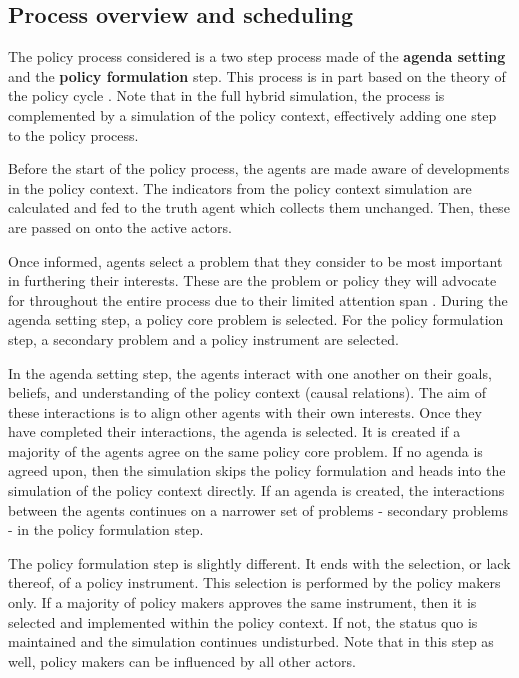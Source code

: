 
\subsection{Process overview and scheduling}
\label{ssec:process}

The policy process considered is a two step process made of the {\bfseries agenda setting} and the {\bfseries policy formulation} step. This process is in part based on the theory of the policy cycle \citep{simmons1974policy}. Note that in the full hybrid simulation, the process is complemented by a simulation of the policy context, effectively adding one step to the policy process.

Before the start of the policy process, the agents are made aware of developments in the policy context. The indicators from the policy context simulation are calculated and fed to the truth agent which collects them unchanged. Then, these are passed on onto the active actors.

Once informed, agents select a problem that they consider to be most important in furthering their interests. These are the problem or policy they will advocate for throughout the entire process due to their limited attention span \citep{baumgartner2014punctuated}. During the agenda setting step, a policy core problem is selected. For the policy formulation step, a secondary problem and a policy instrument are selected.

In the agenda setting step, the agents interact with one another on their goals, beliefs, and understanding of the policy context (causal relations). The aim of these interactions is to align other agents with their own interests. Once they have completed their interactions, the agenda is selected. It is created if a majority of the agents agree on the same policy core problem. If no agenda is agreed upon, then the simulation skips the policy formulation and heads into the simulation of the policy context directly. If an agenda is created, the interactions between the agents continues on a narrower set of problems - secondary problems - in the policy formulation step.

The policy formulation step is slightly different. It ends with the selection, or lack thereof, of a policy instrument. This selection is performed by the policy makers only. If a majority of policy makers approves the same instrument, then it is selected and implemented within the policy context. If not, the status quo is maintained and the simulation continues undisturbed. Note that in this step as well, policy makers can be influenced by all other actors.

